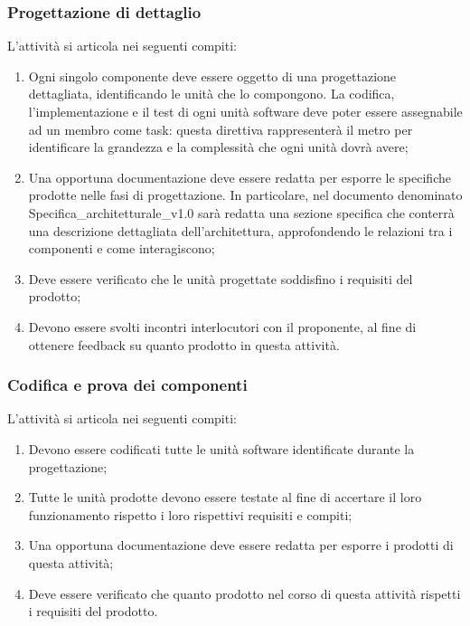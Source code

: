 \subsubsection{Progettazione di dettaglio}
L'attività si articola nei seguenti compiti:
\begin{enumerate}
    \item Ogni singolo componente deve essere oggetto di una progettazione dettagliata, identificando le unità che lo compongono. La codifica, l'implementazione e il test di ogni unità software deve poter essere assegnabile ad un membro come task: questa direttiva rappresenterà il metro per identificare la grandezza e la complessità che ogni unità dovrà avere;
    \item Una opportuna documentazione deve essere redatta per esporre le specifiche prodotte nelle fasi di progettazione. In particolare, nel documento denominato Specifica\_architetturale\_v1.0 sarà redatta una sezione specifica che conterrà una descrizione dettagliata dell'architettura, approfondendo le relazioni tra i componenti e come interagiscono;
    \item Deve essere verificato che le unità progettate soddisfino i requisiti del prodotto;
    \item Devono essere svolti incontri interlocutori con il proponente, al fine di ottenere feedback su quanto prodotto in questa attività.
\end{enumerate}

\subsubsection{Codifica e prova dei componenti}
L'attività si articola nei seguenti compiti:
\begin{enumerate}
    \item Devono essere codificati tutte le unità software identificate durante la progettazione;
    \item Tutte le unità prodotte devono essere testate al fine di accertare il loro funzionamento rispetto i loro rispettivi requisiti e compiti;
    \item Una opportuna documentazione deve essere redatta per esporre i prodotti di questa attività;
    \item Deve essere verificato che quanto prodotto nel corso di questa attività rispetti i requisiti del prodotto.
\end{enumerate}

